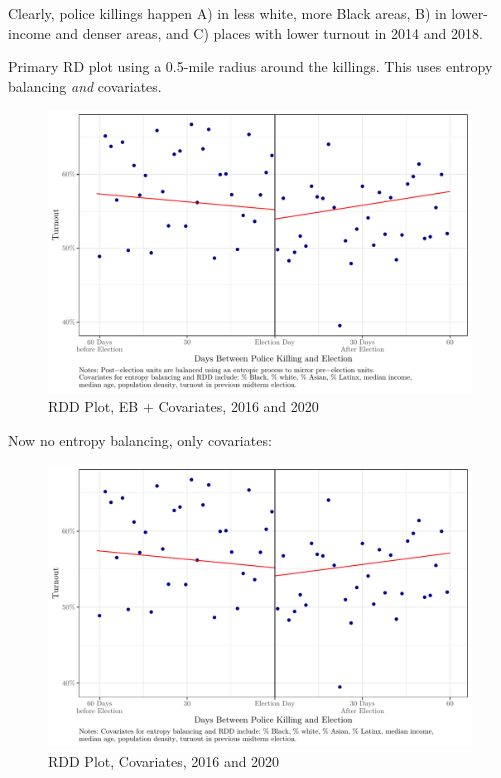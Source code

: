 \documentclass[
  12pt,
]{article}
\begin{document}
Clearly, police killings happen A) in less white, more Black areas, B) in lower-income and denser areas, and C) places with lower turnout in 2014 and 2018.

Primary RD plot using a 0.5-mile radius around the killings. This uses entropy balancing \emph{and} covariates.

\begin{figure}[H]

{\centering \includegraphics{shoot_to_files/figure-latex/rd1-chunk-1} 

}

\caption{\label{fig:map}RDD Plot, EB + Covariates, 2016 and 2020}\label{fig:rd1-chunk}
\end{figure}

Now no entropy balancing, only covariates:

\begin{figure}[H]

{\centering \includegraphics{shoot_to_files/figure-latex/rd2-chunk-1} 

}

\caption{\label{fig:map}RDD Plot, Covariates, 2016 and 2020}\label{fig:rd2-chunk}
\end{figure}
\end{document}
